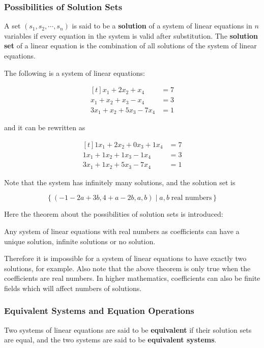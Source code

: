 \documentclass[a4paper,12pt]{article}
\begin{document}
\subsubsection{Possibilities of Solution Sets}
\begin{dft}
  A set $(s_{1},s_{2},\cdots,s_{n})$ is said to be a \textbf{solution} of a system of linear equations in $n$ variables if every equation in the system is valid after substitution. The \textbf{solution set} of a linear equation is the combination of all solutions of the system of linear equations.
\end{dft}\n

\begin{exm}
  The following is a system of linear equations:

  $$\begin{aligned}[t]
    x_{1}+2x_{2}+x_{4}&=7\\
    x_{1}+x_{2}+x_{3}-x_{4}&=3\\
    3x_{1}+x_{2}+5x_{3}-7x_{4}&=1
  \end{aligned}$$\s

  and it can be rewritten as

  $$\begin{aligned}[t]
    1x_{1}+2x_{2}+0x_{3}+1x_{4}&=7\\
    1x_{1}+1x_{2}+1x_{3}-1x_{4}&=3\\
    3x_{1}+1x_{2}+5x_{3}-7x_{4}&=1
  \end{aligned}$$\s

  Note that the system has infinitely many solutions, and the solution set is

  $$\left\{ (-1-2a+3b,4+a-2b,a,b)\mid a,b\;\text{real numbers}\right\}$$
\end{exm}\n

Here the theorem about the possibilities of solution sets is introduced:\n

\begin{thm}
  Any system of linear equations with real numbers as coefficients can have a unique solution, infinite solutions or no solution.
\end{thm}\n

Therefore it is impossible for a system of linear equations to have exactly two solutions, for example. Also note that the above theorem is only true when the coefficients are real numbers. In higher mathematics, coefficients can also be finite fields which will affect numbers of solutions.

\subsubsection{Equivalent Systems and Equation Operations}
\begin{dft}
  Two systems of linear equations are said to be \textbf{equivalent} if their solution sets are equal, and the two systems are said to be \textbf{equivalent systems}.
\end{dft}\n
\end{document}
